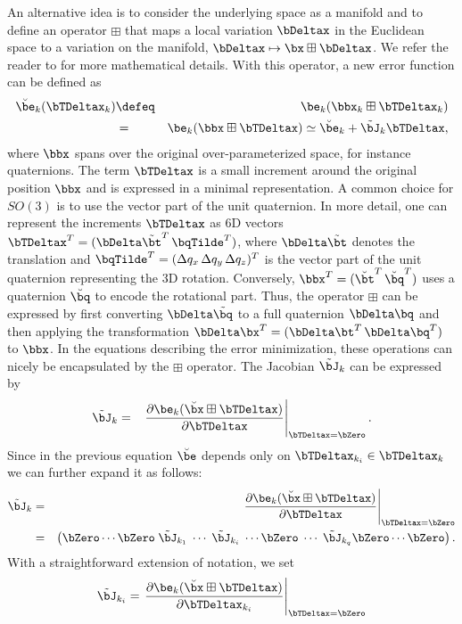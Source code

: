 \documentclass[a4paper]{article}
\begin{document}
An alternative idea is to consider the underlying space as a manifold
and to define an operator $\boxplus$ that maps a local variation
$\bDeltax$ in the Euclidean space to a variation on the manifold,
$\bDeltax\mapsto\bx\boxplus\bDeltax$.  We refer the reader to
\cite[\S1.3]{hertzberg08diplom} for more mathematical details. With
this operator, a new error function can be defined as
\begin{eqnarray}
\breve \be_{k}(\bTDeltax_k) &\defeq&
  \be_{k}(\bbx_k \boxplus \bTDeltax_k) \\
  &=& \be_{k}(\bbx \boxplus \bTDeltax) \label{eq:manifoldTaylor0}
  \simeq \breve \be_{k} + \tilde \bJ_{k} \bTDeltax,
\label{eq:manifoldTaylor}
\end{eqnarray}
where $\bbx$ spans over the original over-parameterized space, for
instance quaternions. The term $\bTDeltax$ is a small increment around
the original position $\bbx$ and is expressed in a minimal
representation. A common choice for $SO(3)$ is to use the vector part
of the unit quaternion.
%
In more detail, one can represent the increments $\bTDeltax$ as 6D vectors
$\bTDeltax^T = ( {\bDelta\tilde\bt}^T \, {\bqTilde}^T)$,
where $\bDelta \tilde \bt$ denotes the translation and $\bqTilde^T
= ( \Delta q_x \, \Delta q_y \, \Delta q_z)^T$ is the
vector part of the unit quaternion representing the 3D rotation.  Conversely, $\bbx^T=(
\breve \bt^T \, \breve \bq^T)$ uses a quaternion $\breve \bq$ to
encode the rotational part.  Thus, the operator $\boxplus$ can be
expressed by first converting $\bDelta \tilde \bq$ to a full quaternion $\bDelta
\bq$ and then applying the transformation $\bDelta \bx ^T = ( \bDelta
\bt^T \, \bDelta \bq^T)$ to $\bbx$.  In the equations
describing the error minimization, these operations can nicely be
encapsulated by the $\boxplus$ operator.  The Jacobian $\tilde
\bJ_{k}$ can be expressed by
\begin{eqnarray}
\tilde \bJ_{k} &=& \left. \frac{\partial \be_{k}(\breve{\bx} \boxplus \bTDeltax)} {\partial \bTDeltax} \right|_{\bTDeltax=\bZero}.
\label{eq:manifoldJacobian}
\end{eqnarray}
Since in the previous equation $\breve{\be}$ depends only on $\bTDeltax_{k_i} \in \bTDeltax_{k}$ we can further expand it as follows:
\begin{eqnarray}
\tilde \bJ_{k} &=& 
\left. 
\frac{\partial \be_{k}(\breve{\bx} \boxplus \bTDeltax)} {\partial \bTDeltax} \right|_{\bTDeltax=\bZero}\\
&=& \left(\bZero \cdots \bZero \; \tilde \bJ_{k_1} \; \cdots \; \tilde \bJ_{k_i} \;\cdots \bZero\; \cdots\;  \tilde \bJ_{k_q} \bZero \cdots \bZero \right).
\label{eq:manifoldJacobianSparse}
\end{eqnarray}
With a straightforward extension of notation, we set
\begin{equation}
\tilde \bJ_{k_i} = \left. \frac{ \partial \be_{k}(\breve{\bx} \boxplus \bTDeltax)}{\partial \bTDeltax_{k_i}} \right|_{\bTDeltax=\bZero}
\end{equation}
\end{document}
